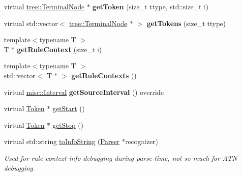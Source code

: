 \begin{DoxyCompactItemize}
virtual \hyperlink{classantlr4_1_1tree_1_1TerminalNode}{tree\+::\+Terminal\+Node} $\ast$ {\bfseries get\+Token} (size\+\_\+t ttype, std\+::size\+\_\+t i)
\item 
\mbox{\label{classantlr4_1_1ParserRuleContext_a642538341e37d3391db1ad558cbb30ab}} 
virtual std\+::vector$<$ \hyperlink{classantlr4_1_1tree_1_1TerminalNode}{tree\+::\+Terminal\+Node} $\ast$ $>$ {\bfseries get\+Tokens} (size\+\_\+t ttype)
\item 
\mbox{\label{classantlr4_1_1ParserRuleContext_a6556b9859491c8b0ff166af71218e2d5}} 
{\footnotesize template$<$typename T $>$ }\\T $\ast$ {\bfseries get\+Rule\+Context} (size\+\_\+t i)
\item 
\mbox{\label{classantlr4_1_1ParserRuleContext_a3e62d59955f25f81d6b0d79111a9fab7}} 
{\footnotesize template$<$typename T $>$ }\\std\+::vector$<$ T $\ast$ $>$ {\bfseries get\+Rule\+Contexts} ()
\item 
\mbox{\label{classantlr4_1_1ParserRuleContext_a8d1858e04ce2a478986ded6dced62dc4}} 
virtual \hyperlink{classantlr4_1_1misc_1_1Interval}{misc\+::\+Interval} {\bfseries get\+Source\+Interval} () override
\item 
virtual \hyperlink{classantlr4_1_1Token}{Token} $\ast$ \hyperlink{classantlr4_1_1ParserRuleContext_a069cff86aad00ea0618985e78291e8fa}{get\+Start} ()
\item 
virtual \hyperlink{classantlr4_1_1Token}{Token} $\ast$ \hyperlink{classantlr4_1_1ParserRuleContext_a51432e71c46225602c504768c50ad776}{get\+Stop} ()
\item 
virtual std\+::string \hyperlink{classantlr4_1_1ParserRuleContext_a36fdb4f19d0b2dce76164b3ffee6d81e}{to\+Info\+String} (\hyperlink{classantlr4_1_1Parser}{Parser} $\ast$recognizer)
\begin{DoxyCompactList}\small\item\em Used for rule context info debugging during parse-\/time, not so much for A\+TN debugging \end{DoxyCompactList}\end{DoxyCompactItemize}
